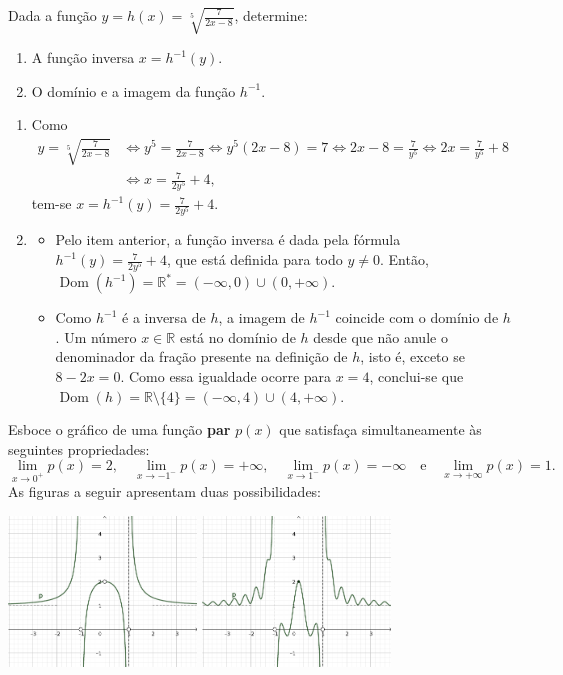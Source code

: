 \documentclass[12pt,a4paper]{article}
\newcommand*\dom[1]{\operatorname{Dom}\left(#1\right)}
\begin{document}
\begin{ExerciseList}
\Exercise[title={2,0}] Dada a função $\displaystyle y = h(x) = \sqrt[5]{\frac{7}{2x-8}}$, determine:
\begin{enumerate}
  \item A função inversa $x = h^{-1}(y)$.
  \item O domínio e a imagem da função $h^{-1}$.
\end{enumerate}
\Answer
\begin{enumerate}
  \item Como
  \begin{align*}
    y = \sqrt[5]{\frac{7}{2x-8}}
    & \Leftrightarrow
    y^5 = \frac{7}{2x-8}
    \Leftrightarrow
    y^5(2x-8) = 7
    \Leftrightarrow
    2x-8 = \frac{7}{y^5}
    \Leftrightarrow
    2x = \frac{7}{y^5}+8 \\
    & \Leftrightarrow
    x = \frac{7}{2y^5}+4,
  \end{align*}
  tem-se $x = h^{-1}(y) = \frac{7}{2y^5} + 4$.
  \item \begin{itemize}
    \item  Pelo item anterior, a função inversa é dada pela fórmula $h^{-1}(y) = \frac{7}{2y^5} + 4$, que está definida para todo $y \neq 0$. Então, $\dom{h^{-1}} = \mathbb{R}^* = (-\infty, 0) \cup (0, +\infty)$.
    \item Como $h^{-1}$ é a inversa de $h$, a imagem de $h^{-1}$ coincide com o domínio de $h$. Um número $x \in \mathbb{R}$ está no domínio de $h$ desde que não anule o denominador da fração presente na definição de $h$, isto é, exceto se $8-2x = 0$. Como essa igualdade ocorre para $x=4$, conclui-se que $\dom{h} = \mathbb{R} \setminus \{4\} = (-\infty, 4) \cup (4, +\infty)$.
  \end{itemize}
\end{enumerate}
\Exercise[title={2,0}] Esboce o gráfico de uma função \textbf{par} $p(x)$ que satisfaça simultaneamente às seguintes propriedades:
\[
  \lim_{x\to 0^+} p(x) = 2,\quad
  \lim_{x\to -1^-} p(x) = +\infty,\quad
  \lim_{x\to 1^-} p(x) = -\infty\quad\text{e}\quad
  \lim_{x\to +\infty} p(x) = 1.
\]
\Answer As figuras a seguir apresentam duas possibilidades:
\begin{center}
\includegraphics[width=5.0cm]{img/prova-1-nex-função-par-v1.pdf}
\includegraphics[width=5.0cm]{img/prova-1-nex-função-par-v2.pdf}
\end{center}


\end{ExerciseList}
\end{document}
